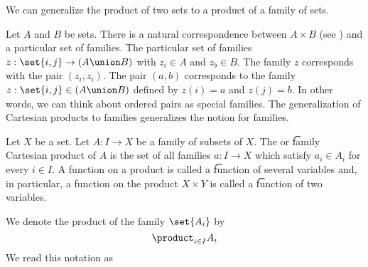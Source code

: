 

We can generalize the product of two sets to a product of a family of sets.


Let $A$ and $B$ be sets.
There is a natural correspondence between $A \times B$ (see ) and a particular set of families.
The particular set of families $z: \set{i, j} \to (A \union B)$ with $z_i \in A$ and $z_b \in B$.
The family $z$ corresponds with the pair $(z_i, z_i)$.
The pair $(a, b)$ corresponds to the family $z: \set{i, j} \in (A \union B)$ defined by $z(i) = a$ and $z(j) = b$.
In other words, we can think about ordered pairs as special families.
The generalization of Cartesian products to families generalizes the notion for families.


Let $X$ be a set.
Let $A: I \to X$ be a family of subsets of $X$.
The  or \t{family Cartesian product} of $A$ is the set of all families $a: I \to X$ which satisfy $a_i \in A_i$ for every $i \in I$.
A function on a product is called a \t{function of several variables} and, in particular, a function on the product $X \times Y$ is called a \t{function of two variables.}


We denote the product of the family $\set{A_i}$ by
\[
  \product_{i \in I} A_i
\]
We read this notation as 
%

